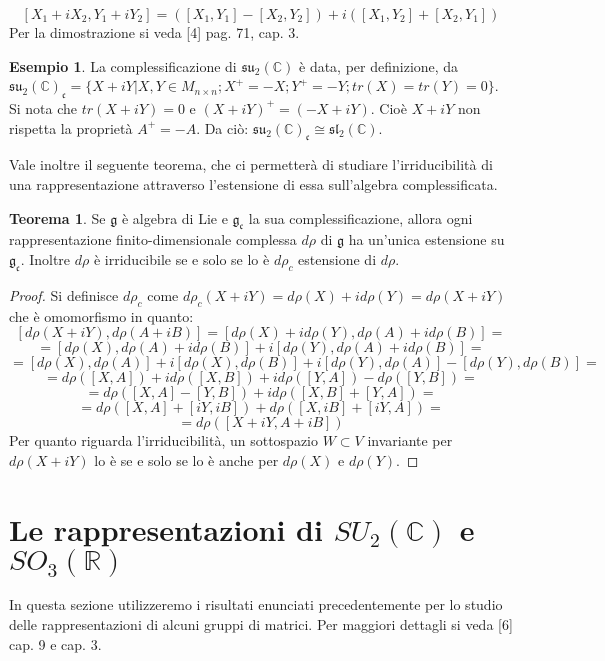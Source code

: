 \documentclass[12pt,a4paper]{report}
\theoremstyle{definition}
\theoremstyle{Theorem}
\newtheorem{Theo}[Def]{Teorema}
\theoremstyle{definition}
\newtheorem{Ex}[Def]{Esempio}
\theoremstyle{definition}
\theoremstyle{definition}
\begin{document}
$$[X_1+iX_2,Y_1+iY_2]=([X_1,Y_1]-[X_2,Y_2])+i([X_1,Y_2]+[X_2,Y_1])$$
Per la dimostrazione si veda [4] pag. 71, cap. 3.\\
\begin{Ex}
La complessificazione di $\mathfrak{su_2(\mathbb{C})}$ è data, per definizione, da \\$\mathfrak{su_2(\mathbb{C})_c}=\{X+iY|X,Y\in M_{n\times n} ;X^{+}=-X;Y^{+}=-Y;tr(X)=tr(Y)=0\}$.\\
Si nota che $tr(X+iY)=0$ e $(X+iY)^+=(-X+iY)$. Cioè $X+iY$ non rispetta la proprietà $A^+=-A$. Da ciò: $\mathfrak{su_2(\mathbb{C})_c}\cong \mathfrak{sl_2(\mathbb{C})}$.
\end{Ex}
Vale inoltre il seguente teorema, che ci permetterà di studiare l'irriducibilità di una rappresentazione attraverso l'estensione di essa sull'algebra complessificata.
\begin{Theo}
	Se $\mathfrak{g}$ è algebra di Lie e $\mathfrak{g_c}$ la sua complessificazione, allora ogni rappresentazione finito-dimensionale complessa  $d\rho$ di $\mathfrak{g}$ ha un'unica estensione su $\mathfrak{g_c}$. Inoltre $d\rho$ è irriducibile se e solo se lo è $d\rho_c$ estensione di $d\rho$.
\end{Theo}
\begin{proof}
	Si definisce $d\rho_c$ come $d\rho_c(X+iY)=d\rho(X)+id\rho(Y)=d\rho(X+iY)$ che è omomorfismo in quanto: 
	$$[d\rho(X+iY),d\rho(A+iB)]=[d\rho(X)+id\rho(Y),d\rho(A)+id\rho(B)]=$$$$=[d\rho(X),d\rho(A)+id\rho(B)]+i[d\rho(Y),d\rho(A)+id\rho(B)]=$$
	$$=[d\rho(X),d\rho(A)]+i[d\rho(X),d\rho(B)]+i[d\rho(Y),d\rho(A)]-[d\rho(Y),d\rho(B)]=$$
	$$=d\rho([X,A])+id\rho([X,B])+id\rho([Y,A])-d\rho([Y,B])=$$
	$$=d\rho([X,A]-[Y,B])+id\rho([X,B]+[Y,A])=$$
	$$=d\rho([X,A]+[iY,iB])+d\rho([X,iB]+[iY,A])=$$
	$$=d\rho([X+iY,A+iB])$$
	Per quanto riguarda l'irriducibilità, un sottospazio $W\subset V$ invariante per $d\rho(X+iY)$ lo è se e solo se lo è anche per $d\rho(X)$ e $d\rho(Y)$.
\end{proof}
\section{Le rappresentazioni di $SU_2(\mathbb{C})$ e $SO_3(\mathbb{R})$} 
In questa sezione utilizzeremo i risultati enunciati precedentemente per lo studio delle rappresentazioni di alcuni gruppi di matrici. Per maggiori dettagli si veda [6] cap. 9 e cap. 3.
\end{document}
